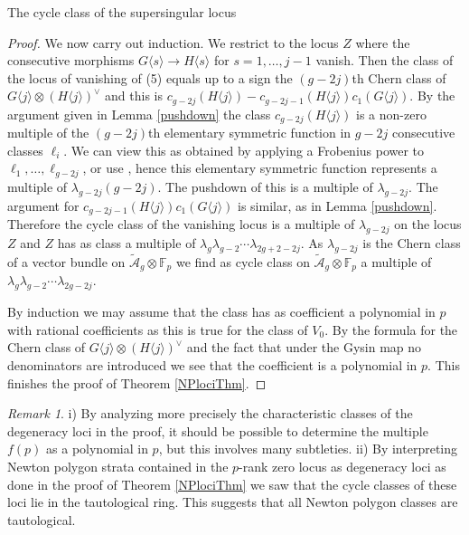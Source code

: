 \documentclass[11pt]{amsart}
\numberwithin{equation}{section}
\newcommand{\FF}{\mathbb F}
\theoremstyle{definition}
\theoremstyle{remark}
\newtheorem{remark}[theorem]{Remark}
\begin{document}
\begin{section}{The cycle class of the supersingular locus}
\begin{proof}
We now carry out induction. We restrict to the locus $Z$ where
 the consecutive morphisms
$G\langle s\rangle \to H\langle s \rangle$ for $s=1,\ldots,j-1$ vanish.
Then 
the class of the locus of 
vanishing of (5) equals up to a sign the $(g-2j)$th Chern class
of $G\langle j \rangle \otimes (H\langle j \rangle)^{\vee}$
and this 
is $c_{g-2j}(H\langle j \rangle)-c_{g-2j-1}(H\langle j \rangle)
c_1(G\langle j \rangle)$. 
By the argument given in Lemma \ref{pushdown} the class
$c_{g-2j}(H\langle j \rangle)$ is a non-zero multiple of 
the $(g-2j)$th elementary symmetric function in $g-2j$ consecutive classes 
$\ell_i$. 
We can view this as obtained by applying a Frobenius power to
$\ell_1,\ldots,\ell_{g-2j}$, or use \cite[Lemma 12.3]{E-vdG}, 
hence this elementary 
symmetric function represents a
multiple of $\lambda_{g-2j}(g-2j)$. The pushdown of this is
a multiple of $\lambda_{g-2j}$. The argument for 
$c_{g-2j-1}(H\langle j \rangle)
c_1(G\langle j \rangle)$ is similar, as in Lemma \ref{pushdown}.
Therefore the cycle class of the vanishing locus is a
multiple of $\lambda_{g-2j}$ on the locus  $Z$ and $Z$ has as class a multiple
of $\lambda_g\lambda_{g-2}\cdots \lambda_{2g+2-2j}$. As  $\lambda_{g-2j}$ 
is the Chern class of a vector bundle on $\tilde{\mathcal{A}}_g \otimes {\FF}_p$
we find as cycle class on $\tilde{\mathcal{A}}_g \otimes {\FF}_p$ a multiple
of $\lambda_g\lambda_{g-2}\cdots \lambda_{2g-2j}$.

By induction we may assume that the class has as coefficient a polynomial in $p$
with rational coefficients 
as this is true for the class of $V_0$.
By the formula for the Chern class of $G\langle j\rangle \otimes (H\langle j \rangle)^{\vee}$
and the fact that under the Gysin map no denominators are introduced we see that
the coefficient is a polynomial in $p$. This finishes the proof of Theorem \ref{NPlociThm}.



\end{proof}

\begin{remark}
i) By analyzing more precisely the characteristic classes of the degeneracy loci 
in the proof, it should be possible
to determine the multiple $f(p)$ as a polynomial in $p$, but this
involves many subtleties. ii)
By interpreting Newton polygon strata contained in the $p$-rank
zero locus as degeneracy loci as 
done in the proof of Theorem \ref{NPlociThm} we saw that the cycle classes
of these loci lie in the tautological ring. This suggests that all Newton polygon classes are tautological.
\end{remark}
\end{section}
\end{document}
